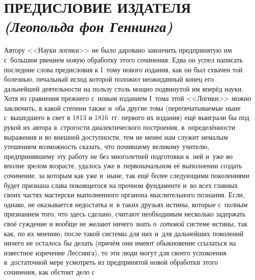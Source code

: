 \hrulefill

\chapter[\mdseries Предисловие издателя (Леопольда фон Геннинга)]%
{ПРЕДИСЛОВИЕ ИЗДАТЕЛЯ\\{\em (Леопольда фон Геннинга)}}

Автору <<Науки логики>> не было даровано закончить предпринятую им с~большим
рвением новую обработку этого сочинения. Едва он успел написать последние
слова предисловия к I~тому нового издания, как он был схвачен той болезнью,
печальный исход которой положил неожиданный конец его дальнейшей
деятельности на пользу столь мощно подвинутой им вперёд науки. Хотя из
сравнения прежнего с~новым изданием I~тома этой <<Логики>> можно заключить, в
какой степени также и~оба другие тома (перепечатываемые ныне с~вышедшего в
свет в 1813 и 1816~гг. первого их издания) ещё выиграли бы под рукой их
автора в~строгости диалектического построения, в~определённости выражения и
во внешней доступности, тем не менее нам служит немалым утешением
возможность сказать, что почившему великому учителю, предпринявшему эту
работу не без многолетней подготовки к~ней и~уже во вполне зрелом возрасте,
удалось уже в~первоначальном её выполнении создать сочинение, за которым
как уже и~ныне, так ещё более следующими поколениями будет признана слава
покоящегося на прочном фундаменте и~во всех главных своих частях мастерски
выполненного органона мыслительного познания. Если, однако, не оказывается
недостатка и~в таких друзьях истины, которые с~полным признанием того, что
здесь сделано, считают необходимым несколько задержать своё суждение и
вообще не желают ничего знать о~{\em готовой} системе
истины, так как, по их мнению, после такой системы для них и~для дальнейших
поколений ничего не осталось бы делать (причём они имеют обыкновение
ссылаться на известное изречение Лессинга), то эти люди могут для своего успокоения в~достаточной мере
усмотреть из предпринятой новой обработки этого сочинения, как обстоит дело с
